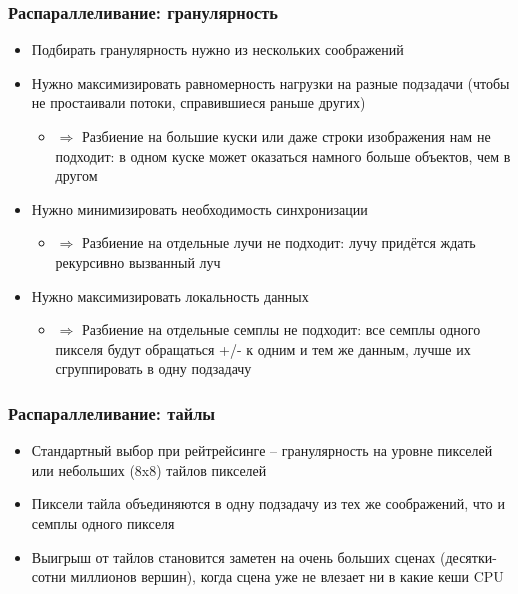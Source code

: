 \documentclass[handout,10pt]{beamer}
\begin{document}
\begin{frame}[fragile]
\frametitle{Распараллеливание: гранулярность}
\begin{itemize}
\item Подбирать гранулярность нужно из нескольких соображений
\pause
\item Нужно максимизировать равномерность нагрузки на разные подзадачи (чтобы не простаивали потоки, справившиеся раньше других)
\pause
\begin{itemize}
\item \begin{math}\Longrightarrow\end{math} Разбиение на большие куски или даже строки изображения нам не подходит: в одном куске может оказаться намного больше объектов, чем в другом
\end{itemize}
\pause
\item Нужно минимизировать необходимость синхронизации
\pause
\begin{itemize}
\item \begin{math}\Longrightarrow\end{math} Разбиение на отдельные лучи не подходит: лучу придётся ждать рекурсивно вызванный луч
\end{itemize}
\pause
\item Нужно максимизировать локальность данных
\pause
\begin{itemize}
\item \begin{math}\Longrightarrow\end{math} Разбиение на отдельные семплы не подходит: все семплы одного пикселя будут обращаться +/- к одним и тем же данным, лучше их сгруппировать в одну подзадачу
\end{itemize}
\end{itemize}
\end{frame}

\begin{frame}[fragile]
\frametitle{Распараллеливание: тайлы}
\begin{itemize}
\item Стандартный выбор при рейтрейсинге -- гранулярность на уровне пикселей или небольших (8x8) тайлов пикселей
\pause
\item Пиксели тайла объединяются в одну подзадачу из тех же соображений, что и семплы одного пикселя
\pause
\item Выигрыш от тайлов становится заметен на очень больших сценах (десятки-сотни миллионов вершин), когда сцена уже не влезает ни в какие кеши CPU
\end{itemize}
\end{frame}
\end{document}
